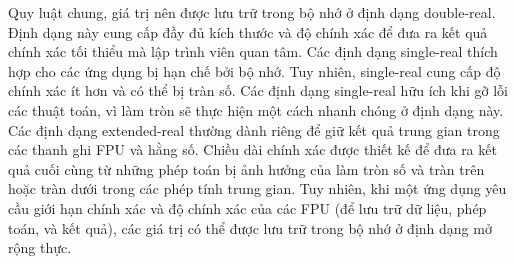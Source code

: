 	Quy luật chung, giá trị nên được lưu trữ trong bộ nhớ ở định dạng double-real. Định dạng này cung cấp đầy đủ kích thước và độ chính xác để đưa ra kết quả chính xác tối thiểu mà lập trình viên quan tâm. Các định dạng single-real thích hợp cho các ứng dụng bị hạn chế bởi bộ nhớ. Tuy nhiên, single-real cung cấp độ chính xác ít hơn và có thể bị tràn số. Các định dạng single-real hữu ích khi gỡ lỗi các thuật toán, vì làm tròn sẽ thực hiện một cách nhanh chóng ở định dạng này. Các định dạng extended-real thường dành riêng để giữ kết quả trung gian trong các thanh ghi FPU và hằng số. Chiều dài chính xác được thiết kế để đưa ra kết quả cuối cùng từ những phép toán bị ảnh hưởng của làm tròn số và tràn trên hoặc tràn dưới trong các phép tính trung gian. Tuy nhiên, khi một ứng dụng yêu cầu giới hạn chính xác và độ chính xác của các FPU (để lưu trữ dữ liệu, phép toán, và kết quả), các giá trị có thể được lưu trữ trong bộ nhớ ở định dạng mở rộng thực.\\
	
